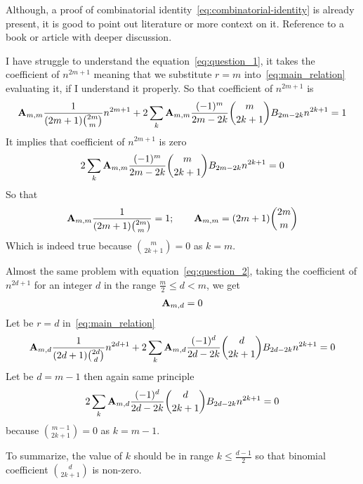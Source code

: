 ﻿\begin{question}
    Although, a proof of combinatorial identity~\eqref{eq:combinatorial-identity} is already present, it is good
    to point out literature or more context on it.
    Reference to a book or article with deeper discussion.
\end{question}
\begin{question}
    I have struggle to understand the equation~\eqref{eq:question_1}, it takes the coefficient of $n^{2m+1}$ meaning that
    we substitute $r=m$ into~\eqref{eq:main_relation} evaluating it, if I understand it properly.
    So that coefficient of $n^{2m+1}$ is
    \begin{align*}
         {\mathbf{A}} \sb{m,m} \frac{1}{(2m+1) \binom{2m}m} n^{2m+1}
        + 2 \sum_{k} {\mathbf{A}} \sb{m,m} \frac{(-1)^m}{2m-2k} \binom{m}{2k+1} {B}\sb{2m-2k} n^{2k+1} = 1
    \end{align*}
    It implies that coefficient of $n^{2m+1}$ is zero
    \begin{align*}
        2 \sum_{k} {\mathbf{A}} \sb{m,m} \frac{(-1)^m}{2m-2k} \binom{m}{2k+1} {B}\sb{2m-2k} n^{2k+1} = 0
    \end{align*}
    So that
    \begin{align*}
        {\mathbf{A}} \sb{m,m} \frac{1}{(2m+1) \binom{2m}m} = 1; \quad \quad {\mathbf{A}} \sb{m,m} = (2m+1)\binom{2m}{m}
    \end{align*}
    Which is indeed true because $\binom{m}{2k+1} = 0$ as $k=m$.
\end{question}
\begin{question}
    Almost the same problem with equation~\eqref{eq:question_2},
    taking the coefficient of $n^{2d+1}$ for an integer $d$ in the range $\frac{m}{2} \leq d < m$, we get
    \begin{align*}
        {\mathbf{A}} \sb{m,d} = 0
    \end{align*}
    Let be $r=d$ in~\eqref{eq:main_relation}
    \begin{align*}
        {\mathbf{A}} \sb{m,d} \frac{1}{(2d+1) \binom{2d}d} n^{2d+1}
        + 2 \sum_{k} {\mathbf{A}} \sb{m,d} \frac{(-1)^d}{2d-2k} \binom{d}{2k+1} {B}\sb{2d-2k} n^{2k+1} = 0
    \end{align*}
    Let be $d=m-1$ then again same principle
    \begin{align*}
        2 \sum_{k} {\mathbf{A}} \sb{m,d} \frac{(-1)^d}{2d-2k} \binom{d}{2k+1} {B}\sb{2d-2k} n^{2k+1} = 0
    \end{align*}
    because $\binom{m-1}{2k+1}=0$ as $k=m-1$.
\end{question}
To summarize, the value of $k$ should be in range $k \leq \frac{d-1}{2}$ so that binomial coefficient $\binom{d}{2k+1}$
is non-zero.
